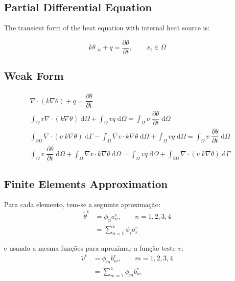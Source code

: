 \documentclass[10pt, a4paper]{article}
\begin{document}
\subsection{Partial Differential Equation}

The transient form of the heat equation with internal heat source is:

\begin{equation}
k \theta_{,ii} + q = \dfrac{\partial \theta}{\partial t} , \qquad x_i \in \Omega
\end{equation}



\subsection{Weak Form}

\begin{align*}
&\nabla \cdot (k \nabla \theta)  + q = \dfrac{\partial \theta}{\partial t} \\ 
& \int_\Omega v \nabla \cdot (k \nabla \theta) \; \mathrm{d}\Omega + \int_\Omega v q\; \mathrm{d}\Omega = \int_\Omega v \; \dfrac{\partial \theta}{\partial t}\; \mathrm{d}\Omega \\
&\int_{\partial \Omega} \nabla \cdot (v \; k \nabla \theta) \; \mathrm{d}\Gamma - \int_\Omega \nabla v \cdot k\nabla \theta \; \mathrm{d}\Omega +  \int_\Omega v q\; \mathrm{d}\Omega = \int_\Omega v \;\dfrac{\partial \theta}{\partial t}\; \mathrm{d}\Omega \\
&\int_\Omega v \; \dfrac{\partial \theta}{\partial t}\; \mathrm{d}\Omega + \int_\Omega \nabla v \cdot k\nabla \theta \; \mathrm{d}\Omega = \int_\Omega v q\; \mathrm{d}\Omega + \int_{\partial \Omega} \nabla \cdot (v \; k \nabla \theta) \; \mathrm{d}\Gamma
\end{align*}


\subsection{Finite Elements Approximation}

Para cada elemento, tem-se a seguinte aproximação:
\begin{align*}
\tilde{\theta}^e &= \phi_n a_n^e, \qquad n=1,2,3,4\\
&= \sum_{n=1}^4 \phi_i a_i^e
\end{align*}

e usando a mesma funções para aproximar a função teste $v$:
\begin{align*}
\tilde{v}^e &= \phi_m b_m^e, \qquad m=1,2,3,4\\
&= \sum_{m=1}^4 \phi_m b_m^e
\end{align*}
\end{document}
